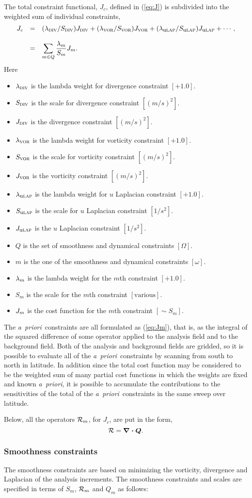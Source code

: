 \documentclass[11pt]{article}
\newcommand{\apriori}{{\em a~priori}}
\newcommand{\Dot}[2]{\Vector{{#1} \cdot {#2}}}
\newcommand{\glm}[1]{\mbox{$ \lambda_{\mbox{\tiny #1}} $}}
\newcommand{\gl}[1]{\mbox{$ \lambda_{#1} $}}
\newcommand{\Jm}[1]{\mbox{$ J_{\mbox{\tiny #1}} $}}
\newcommand{\J}[1]{\mbox{$ J_{#1} $}}
\newcommand{\Vector}[1]{\mbox{\boldmath ${#1}$}}
\newcommand{\xxxx}[1]{\subsubsection {#1}}
\newcommand{\eql}[2]{\begin{equation} \label{eq:#1} #2 \end{equation}}
\newcommand{\eqr}[1]{(\ref{eq:#1})}
\newcommand{\vardef}[3]{\item $ {#1} $ is the {#2} $ [{#3}] $. }
\renewcommand{\apriori}{{\em a~priori}}
\newcommand{\subsc}[2]{\mbox{$ #1_{\mbox{\sc \footnotesize #2}} $}}
\renewcommand{\Jm}[1]{\subsc{J}{{#1}}}
\newcommand{\Sm}[1]{\subsc{S}{{#1}}}
\renewcommand{\glm}[1]{\subsc{\lambda}{{#1}}}
\newcommand{\Operator}[1]{\mbox{$ \mathcal #1 $}}
\newcommand{\glmsm}[1]{(\glm{{#1}}/\Sm{{#1}})}
\newcommand{\lap}[1]{\mbox{{\rm #1}{\sc lap}}}
\begin{document}
The total constraint functional, \J{c}, defined in \eqr{J} is
subdivided into the weighted sum of individual constraints,
 \eql{Jc}{ \begin{array}{ccl}
  J_c & = & \glmsm{div} \Jm{div} + \glmsm{vor} \Jm{vor} + 
  \glmsm{\lap{u}} \Jm{\lap{u}} + \cdots , \\ & & \\
      & = & \displaystyle \sum_{m \in Q} \frac{\gl{m}}{S_m} \J{m} .
 \end{array} }
 Here \begin{itemize}
  \vardef{\glm{div}}{lambda weight for divergence constraint}{+1.0}
  \vardef{\Sm{div}}{scale for divergence constraint}{(m/s)^2}
  \vardef{\Jm{div}}{divergence constraint}{(m/s)^2}
  \vardef{\glm{vor}}{lambda weight for vorticity constraint}{+1.0}
  \vardef{\Sm{vor}}{scale for vorticity constraint}{(m/s)^2}
  \vardef{\Jm{vor}}{vorticity constraint}{(m/s)^2}
  \vardef{\glm{\lap{u}}}{lambda weight for $u$ Laplacian constraint}{+1.0}
  \vardef{\Sm{\lap{u}}}{scale for $u$ Laplacian constraint}{1/s^2}
  \vardef{\Jm{\lap{u}}}{$u$ Laplacian constraint}{1/s^2}
  \vardef{Q}{set of smoothness and dynamical constraints}{\Omega}
  \vardef{m}{one of the smoothness and dynamical constraints}{\omega}
  \vardef{\gl{m}}{lambda weight for the $m$th constraint}{+1.0}
  \vardef{S_m}{scale for the $m$th constraint}{\mbox{various}}
  \vardef{\J{m}}{cost function for the $m$th constraint}{\sim S_m}
 \end{itemize} 

The \apriori\ constraints are all formulated as \eqr{Jm}, that is, as
the integral of the squared difference of some operator applied to the
analysis field and to the background field.  Both of the analysis and
background fields are gridded, so it is possible to evaluate all of
the \apriori\ constraints by scanning from south to north in latitude.
In addition since the total cost function may be considered to be the
weighted sum of many partial cost functions in which the weights are
fixed and known \apriori, it is possible to accumulate the
contributions to the sensitivities of the total of the \apriori\
constraints in the same sweep over latitude.

Below, all the operators $ \Operator{R}_m $, for \J{c}, are put in the
form,
 \eql{R}{ \Operator{R} = \Dot{\nabla}{Q} . }

\xxxx {Smoothness constraints}

The smoothness constraints are based on minimizing the vorticity,
divergence and Laplacian of the analysis increments.  The smoothness
constraints and scales are specified in terms of $S_m$,
$\Operator{R}_m$ and $Q_m$ as follows:
\end{document}
